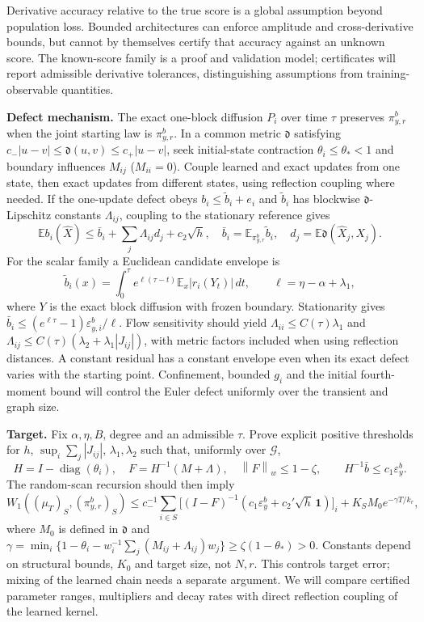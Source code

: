 \documentclass[12pt,a4paper]{article}
\newcommand{\E}{\mathbb E}
\newcommand{\W}{W_1}
\newcommand{\pir}{\pi_{y,r}^{b}}
\newcommand{\epsb}{\varepsilon^{b}_{y}}
\newcommand{\normw}[1]{\left\|#1\right\|_w}
\begin{document}
Derivative accuracy relative to the true score is a global assumption beyond population loss. Bounded architectures can enforce amplitude and cross-derivative bounds, but cannot by themselves certify that accuracy against an unknown score. The known-score family is a proof and validation model; certificates will report admissible derivative tolerances, distinguishing assumptions from training-observable quantities.

\textbf{Defect mechanism.} The exact one-block diffusion $P_i$ over time $\tau$ preserves $\pir$ when the joint starting law is $\pir$. In a common metric $\mathfrak d$ satisfying $c_-|u-v|\leq\mathfrak d(u,v)\leq c_+|u-v|$, seek initial-state contraction $\theta_i\leq\theta_*<1$ and boundary influences $M_{ij}$ ($M_{ii}=0$). Couple learned and exact updates from one state, then exact updates from different states, using reflection coupling where needed. If the one-update defect obeys $b_i\leq\widetilde b_i+e_i$ and $\widetilde b_i$ has blockwise $\mathfrak d$-Lipschitz constants $\Lambda_{ij}$, coupling to the stationary reference gives
\[
 \E b_i(\widehat X)\leq\bar b_i+\sum_j\Lambda_{ij}d_j+c_2\sqrt h,
 \quad \bar b_i=\E_{\pir}\widetilde b_i,\quad d_j=\E\mathfrak d(\widehat X_j,X_j).
\]
For the scalar family a Euclidean candidate envelope is
\begin{equation}\label{eq:defect}
 \widetilde b_i(x)=\int_0^\tau e^{\ell(\tau-t)}\E_x|r_i(Y_t)|\,dt,
 \qquad \ell=\eta-\alpha+\lambda_1,
\end{equation}
where $Y$ is the exact block diffusion with frozen boundary. Stationarity gives $\bar b_i\leq(e^{\ell\tau}-1)\varepsilon^b_{y,i}/\ell$. Flow sensitivity should yield $\Lambda_{ii}\leq C(\tau)\lambda_1$ and $\Lambda_{ij}\leq C(\tau)(\lambda_2+\lambda_1|J_{ij}|)$, with metric factors included when using reflection distances. A constant residual has a constant envelope even when its exact defect varies with the starting point. Confinement, bounded $g_i$ and the initial fourth-moment bound will control the Euler defect uniformly over the transient and graph size.

\textbf{Target.} Fix $\alpha,\eta,B$, degree and an admissible $\tau$. Prove explicit positive thresholds for $h$, $\sup_i\sum_j|J_{ij}|$, $\lambda_1,\lambda_2$ such that, uniformly over $\mathcal G$,
\[
 H=I-\operatorname{diag}(\theta_i),\quad F=H^{-1}(M+\Lambda),\quad
 \normw{F}\leq1-\zeta,\qquad H^{-1}\bar b\leq c_1\epsb.
\]
The random-scan recursion should then imply
\begin{equation}\label{eq:main}
 \W((\mu_T)_S,(\pir)_S)\leq
 c_-^{-1}\sum_{i\in S}\bigl[(I-F)^{-1}(c_1\epsb+c_2'\sqrt h\,\mathbf1)\bigr]_i
 +K_SM_0e^{-\gamma T/k_r},
\end{equation}
where $M_0$ is defined in $\mathfrak d$ and
$\gamma=\min_i\{1-\theta_i-w_i^{-1}\sum_j(M_{ij}+\Lambda_{ij})w_j\}\geq\zeta(1-\theta_*)>0$.
Constants depend on structural bounds, $K_0$ and target size, not $N,r$. This controls target error; mixing of the learned chain needs a separate argument. We will compare certified parameter ranges, multipliers and decay rates with direct reflection coupling of the learned kernel.
\end{document}
